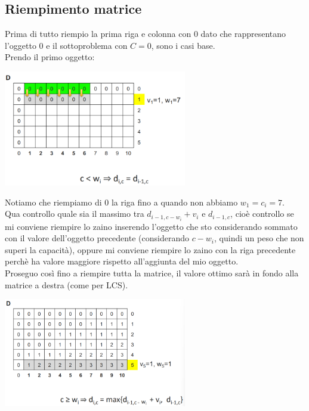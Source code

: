 \subsection{Riempimento matrice}
Prima di tutto riempio la prima riga e colonna con 0 dato che rappresentano l'oggetto 0 e il
sottoproblema con $C=0$, sono i casi base.\\
Prendo il primo oggetto:
\begin{center}
    \includegraphics[width=80mm,scale=0.5]{chapters_ulerich/img/knapsack_matrix_filling_v1.png}
\end{center}
Notiamo che riempiamo di 0 la riga fino a quando non abbiamo $w_1 = c_i = 7$.\\
Qua controllo quale sia il massimo tra $d_{i-1,c-w_i} + v_i$ e $d_{i-1,c}$, cioè controllo se mi
conviene riempire lo zaino inserendo l'oggetto che sto considerando sommato con il valore dell'oggetto
precedente (considerando $c-w_i$, quindi un peso che non superi la capacità), oppure mi conviene riempire lo
zaino con la riga precedente perchè ha valore maggiore rispetto all'aggiunta del mio oggetto.\\
Proseguo così fino a riempire tutta la matrice, il valore ottimo sarà in fondo alla matrice a destra (come per LCS).
\begin{center}
    \includegraphics[width=80mm,scale=0.5]{chapters_ulerich/img/knapsack_matrix_filled.png}
\end{center}

